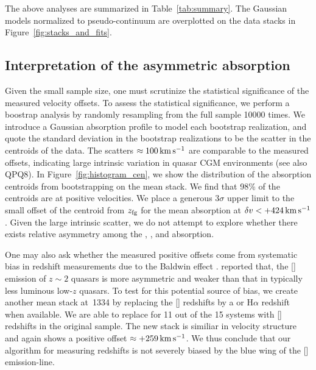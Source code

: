 \documentclass[iop]{emulateapj}
\begin{document}
The above analyses are summarized in Table~\ref{tab:summary}. The 
Gaussian models normalized to pseudo-continuum are overplotted on the data stacks in 
Figure~\ref{fig:stacks_and_fits}. 

%


\subsection{Interpretation of the asymmetric absorption}
\label{sec:significance_+ve}

Given the small sample size, one must scrutinize the statistical significance of the measured 
velocity offsets. To assess the statistical significance, we perform a boostrap analysis by 
randomly resampling from the full sample 10000 times. We introduce a Gaussian absorption profile 
to model each bootstrap realization, and quote the standard deviation in the bootstrap 
realizations to be the scatter in the centroids of the data. The scatters 
$\approx100\,{\rm km\,s^{-1}}$ are comparable to the measured offsets, indicating large intrinsic 
variation in quasar CGM environments (see also QPQ8). In Figure~\ref{fig:histogram_cen}, we show 
the distribution of the absorption centroids from bootstrapping on the  mean stack. We 
find that 98\% of the centroids are at positive velocities. We place a generous $3\sigma$ upper 
limit to the small offset of the centroid from $z_{\rm fg}$ for the  mean absorption at 
$\delta v<+424\,{\rm km\,s^{-1}}$. Given the large intrinsic scatter, we do not attempt to explore
whether there exists relative asymmetry among the , , and  
absorption. 

One may also ask whether the measured positive offsets come from systematic bias in redshift 
measurements due to the Baldwin effect \citep{Baldwin77}. \cite{Shen16} reported that, the 
[] emission of $z\sim2$ quasars is more asymmetric and weaker than that in typically 
less luminous low-$z$ quasars. To test for this potential source of bias, we create another mean 
stack at \,1334 by replacing the [] redshifts by a  or H$\alpha$ 
redshift when available. We are able to replace for 11 out of the 15 systems with [] 
redshifts in the original sample. The new stack is similiar in velocity structure and again shows 
a positive offset $\approx+259\,{\rm km\,s^{-1}}$. We thus conclude that our algorithm for 
measuring redshifts is not severely biased by the blue wing of the [] emission-line. 
\end{document}
